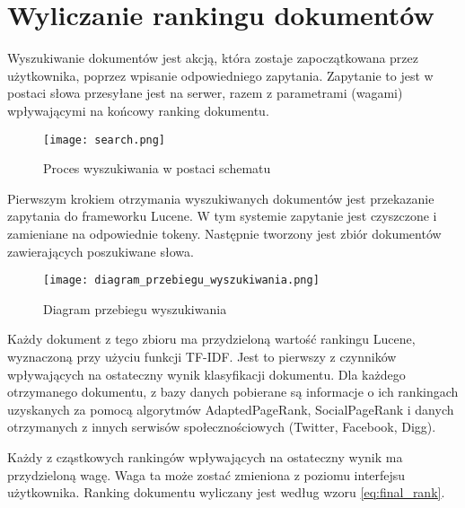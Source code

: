 \section{Wyliczanie rankingu dokumentów}

Wyszukiwanie dokumentów jest akcją, która zostaje zapoczątkowana przez użytkownika, poprzez wpisanie odpowiedniego zapytania. Zapytanie to jest w postaci słowa przesyłane jest na serwer, razem z parametrami (wagami) wpływającymi na końcowy ranking dokumentu.

\begin{figure}[htb]
\centering
\texttt{[image: search.png]}
\caption{Proces wyszukiwania w postaci schematu}
\label{fig:wyszukiwanie}
\end{figure}

Pierwszym krokiem otrzymania wyszukiwanych dokumentów jest przekazanie zapytania do frameworku Lucene. W tym systemie zapytanie jest czyszczone i zamieniane na odpowiednie tokeny. Następnie tworzony jest zbiór dokumentów zawierających poszukiwane słowa. 

\begin{figure}[htb]
\centering
\texttt{[image: diagram\_przebiegu\_wyszukiwania.png]}
\caption{Diagram przebiegu wyszukiwania}
\label{fig:wyszukiwanie_diagram_seq}
\end{figure}

Każdy dokument z tego zbioru ma przydzieloną wartość rankingu Lucene, wyznaczoną przy użyciu funkcji TF-IDF. Jest to pierwszy z czynników wpływających na ostateczny wynik klasyfikacji dokumentu. Dla każdego otrzymanego dokumentu, z bazy danych pobierane są informacje o ich rankingach uzyskanych za pomocą algorytmów  AdaptedPageRank, SocialPageRank i danych otrzymanych z innych serwisów społecznościowych (Twitter, Facebook, Digg). 

Każdy z cząstkowych rankingów wpływających na ostateczny wynik ma przydzieloną wagę. Waga ta może zostać zmieniona z poziomu interfejsu użytkownika. Ranking dokumentu wyliczany jest według wzoru \ref{eq:final_rank}.




